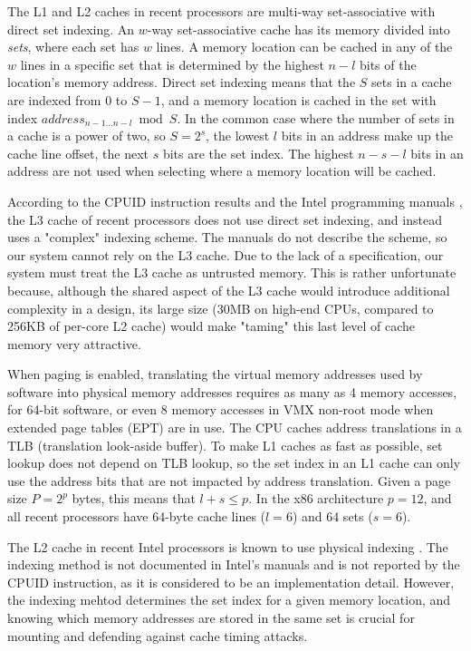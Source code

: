 The L1 and L2 caches in recent processors are multi-way set-associative with
direct set indexing. An $w$-way set-associative cache has its memory divided
into \textit{sets}, where each set has $w$ lines. A memory location can be
cached in any of the $w$ lines in a specific set that is determined by the
highest $n - l$ bits of the location's memory address. Direct set indexing
means that the $S$ sets in a cache are indexed from $0$ to $S - 1$, and a
memory location is cached in the set with index
$address_{n - 1 \ldots n - l} \bmod S$. In the common case where the number of
sets in a cache is a power of two, so $S = 2^{s}$, the lowest $l$ bits in an
address make up the cache line offset, the next $s$ bits are the set index.
The highest $n - s - l$ bits in an address are not used when selecting where a
memory location will be cached.

According to the CPUID instruction results and the Intel programming manuals
\cite{intel2013manual}, the L3 cache of recent processors does not use direct
set indexing, and instead uses a "complex" indexing scheme. The manuals do not
describe the scheme, so our system cannot rely on the L3 cache. Due to the lack
of a specification, our system must treat the L3 cache as untrusted memory.
This is rather unfortunate because, although the shared aspect of the L3 cache
would introduce additional complexity in a design, its large size (30MB on
high-end CPUs, compared to 256KB of per-core L2 cache) would make "taming" this
last level of cache memory very attractive.

When paging is enabled, translating the virtual memory addresses used by
software into physical memory addresses requires as many as 4 memory accesses,
for 64-bit software, or even 8 memory accesses in VMX non-root mode when
extended page tables (EPT) are in use. The CPU caches address translations in a
TLB (translation look-aside buffer). To make L1 caches as fast as possible, set
lookup does not depend on TLB lookup, so the set index in an L1 cache can only
use the address bits that are not impacted by address translation. Given a page
size $P = 2^{p}$ bytes, this means that $l + s \le p$. In the x86 architecture
$p = 12$, and all recent processors have 64-byte cache lines ($l = 6$) and
64 sets ($s = 6$).

The L2 cache in recent Intel processors is known to use physical indexing
\cite{patterson2013architecture}. The indexing method is not documented in
Intel's manuals and is not reported by the CPUID instruction, as it is
considered to be an implementation detail. However, the indexing mehtod
determines the set index for a given memory location, and knowing which memory
addresses are stored in the same set is crucial for mounting and defending
against cache timing attacks.

